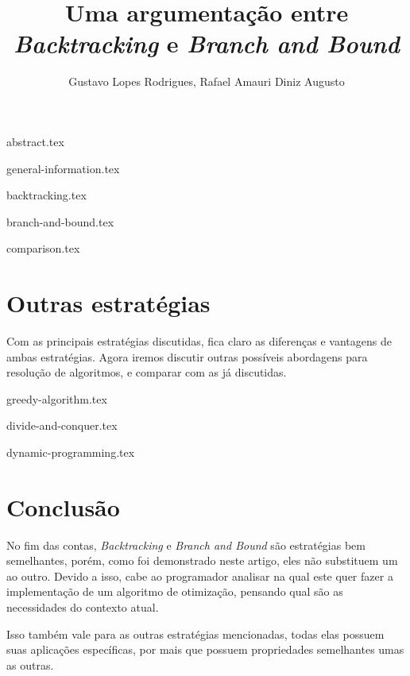 \documentclass[12pt]{article}
\title{Uma argumentação entre \emph{Backtracking} e \emph{Branch and Bound}}
\author{Gustavo Lopes Rodrigues\inst{1}, Rafael Amauri Diniz Augusto\inst{2}}
\begin{document}
 

  \maketitle

  {abstract.tex}

  {general-information.tex}

  {backtracking.tex}

  {branch-and-bound.tex}

  {comparison.tex}

  \section{Outras estratégias} \label{sec:other-strategies}

    Com as principais estratégias discutidas, fica claro as diferenças 
    e vantagens de ambas estratégias. Agora iremos discutir outras possíveis
    abordagens para resolução de algoritmos, e comparar com as já discutidas.
    
    {greedy-algorithm.tex}

    {divide-and-conquer.tex}
  
    {dynamic-programming.tex}

  \section{Conclusão}

  No fim das contas, \emph{Backtracking} e \emph{Branch and Bound} são estratégias 
  bem semelhantes, porém, como foi demonstrado neste artigo, eles não substituem um ao 
  outro. Devido a isso, cabe ao programador analisar na qual este quer fazer a implementação 
  de um algoritmo de otimização, pensando qual são as necessidades do contexto atual.

  Isso também vale para as outras estratégias mencionadas, todas elas possuem suas aplicações 
  específicas, por mais que possuem propriedades semelhantes umas as outras.

  
  
\end{document}

